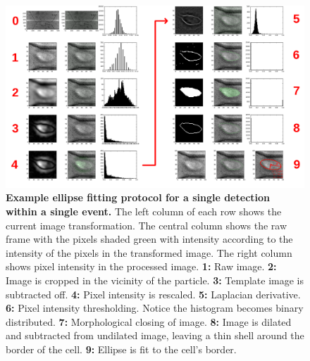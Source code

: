 			
			\begin{figure}
				\includegraphics[width=\textwidth]{ellipsefittingprotocol.png}
				\caption{\textbf{Example ellipse fitting protocol for a single detection within a single event.} The left column of each row shows the current image transformation. The central column shows the raw frame with the pixels shaded green with intensity according to the intensity of the pixels in the transformed image. The right column shows pixel intensity in the processed image. \textbf{1: } Raw image. \textbf{2:} Image is cropped in the vicinity of the particle. \textbf{3:} Template image is subtracted off. \textbf{4:} Pixel intensity is rescaled. \textbf{5:} Laplacian derivative. \textbf{6:} Pixel intensity thresholding. Notice the histogram becomes binary distributed. \textbf{7:} Morphological closing of image. \textbf{8:} Image is dilated and subtracted from undilated image, leaving a thin shell around the border of the cell. \textbf{9:} Ellipse is fit to the cell's border.}
				\label{fig:ellipsefittingprotocol}
			\end{figure}

			
			
